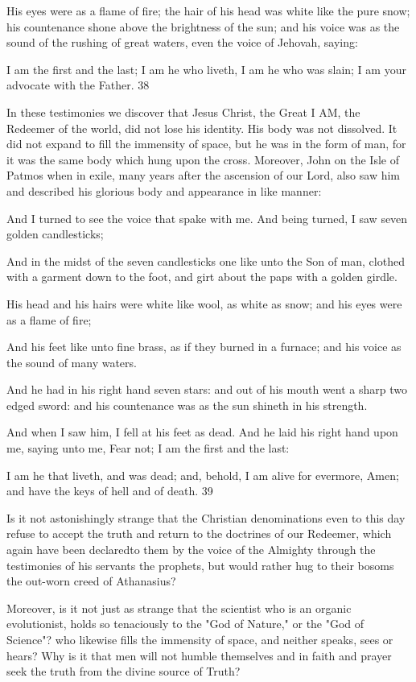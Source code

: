 His eyes were as a flame of fire; the hair of his head was white like the pure snow; his
countenance shone above the brightness of the sun; and his voice was as the sound of the
rushing of great waters, even the voice of Jehovah, saying:

I am the first and the last; I am he who liveth, I am he who was slain; I am your advocate
with the Father. 38

In these testimonies we discover that Jesus Christ, the Great I AM, the Redeemer of the
world, did not lose his identity. His body was not dissolved. It did not expand to fill the
immensity of space, but he was in the form of man, for it was the same body which hung
upon the cross. Moreover, John on the Isle of Patmos when in exile, many years after the
ascension of our Lord, also saw him and described his glorious body and appearance in like
manner:

And I turned to see the voice that spake with me. And being turned, I saw seven golden
candlesticks;

And in the midst of the seven candlesticks one like unto the Son of man, clothed with a
garment down to the foot, and girt about the paps with a golden girdle.

His head and his hairs were white like wool, as white as snow; and his eyes were as a flame
of fire;

And his feet like unto fine brass, as if they burned in a furnace; and his voice as the sound of
many waters.

And he had in his right hand seven stars: and out of his mouth went a sharp two edged sword:
and his countenance was as the sun shineth in his strength.

And when I saw him, I fell at his feet as dead. And he laid his right hand upon me, saying
unto me, Fear not; I am the first and the last:

I am he that liveth, and was dead; and, behold, I am alive for evermore, Amen; and have the
keys of hell and of death. 39

Is it not astonishingly strange that the Christian denominations even to this day refuse to
accept the truth and return to the doctrines of our Redeemer, which again have been declaredto them by the voice of the Almighty through the testimonies of his servants the prophets, but
would rather hug to their bosoms the out-worn creed of Athanasius?

Moreover, is it not just as strange that the scientist who is an organic evolutionist, holds so
tenaciously to the "God of Nature," or the "God of Science"? who likewise fills the
immensity of space, and neither speaks, sees or hears? Why is it that men will not humble
themselves and in faith and prayer seek the truth from the divine source of Truth?

